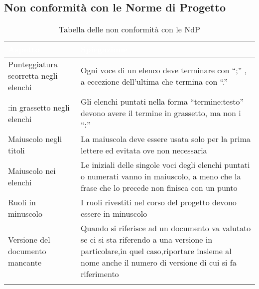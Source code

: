\subsection{Non conformità con le Norme di Progetto}
{
    \setlength{\freewidth}{\dimexpr\textwidth-10\tabcolsep}
    \renewcommand{\arraystretch}{1.5}
    \centering
    \setlength{\aboverulesep}{0pt}
    \setlength{\belowrulesep}{0pt}
    \begin{longtable}{C{.5\freewidth} C{.5\freewidth}}
       \toprule
    \textcolor{white}{\textbf{Aspetto}}&
    \textcolor{white}{\textbf{Spiegazione}} \\
    \toprule
    \endhead
    Punteggiatura scorretta negli elenchi & Ogni voce di un elenco deve terminare con “;” , a eccezione dell'ultima che termina con “.” \\
    :in grassetto negli elenchi & Gli elenchi puntati nella forma “termine:testo” devono avere il termine in grassetto, ma non i “:” \\
    Maiuscolo negli titoli & La maiuscola deve essere usata solo per la prima lettere ed evitata ove non necessaria \\
    Maiuscolo nei elenchi & Le iniziali delle singole voci degli elenchi puntati o numerati vanno in maiuscolo, a meno che la frase che lo precede non finisca con un punto \\
    Ruoli in minuscolo & I ruoli rivestiti nel corso del progetto devono essere in minuscolo \\
    Versione del documento mancante & Quando si riferisce ad un documento va valutato se ci si sta riferendo a una versione in particolare,in quel caso,riportare insieme al nome anche il numero di versione di cui si fa riferimento\\
    
    \bottomrule
    \caption{Tabella delle non conformità con le NdP}
\end{longtable}
}

